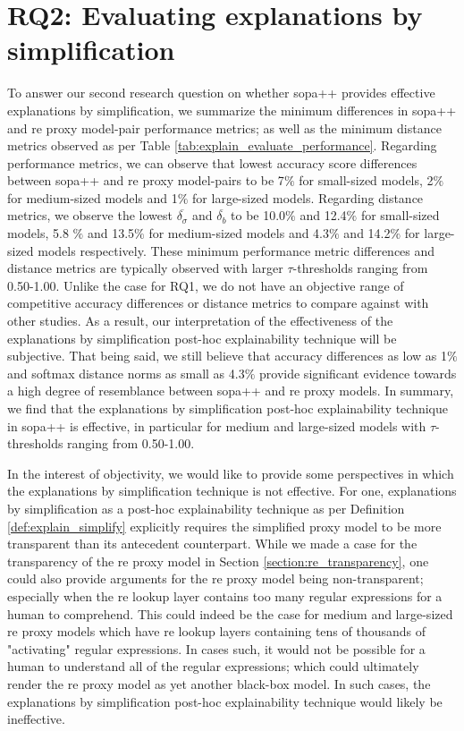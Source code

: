 \section{RQ2: Evaluating explanations by simplification}

To answer our second research question on whether \ac{sopa}++ provides effective
explanations by simplification, we summarize the minimum differences in \ac{sopa}++
and \ac{re} proxy model-pair performance metrics; as well as the minimum distance
metrics observed as per Table \ref{tab:explain_evaluate_performance}. Regarding
performance metrics, we can observe that lowest accuracy score differences
between \ac{sopa}++ and \ac{re} proxy model-pairs to be 7$\%$ for small-sized models, 2$\%$
for medium-sized models and 1$\%$ for large-sized models. Regarding distance
metrics, we observe the lowest $\overline{\delta_{\sigma}}$ and
$\overline{\delta_{b}}$ to be 10.0$\%$ and 12.4$\%$ for small-sized models, 5.8
$\%$ and 13.5$\%$ for medium-sized models and 4.3$\%$ and 14.2$\%$ for
large-sized models respectively. These minimum performance metric differences
and distance metrics are typically observed with larger $\tau$-thresholds
ranging from 0.50-1.00. Unlike the case for RQ1, we do not have an objective
range of competitive accuracy differences or distance metrics to compare against
with other studies. As a result, our interpretation of the effectiveness of the
explanations by simplification post-hoc explainability technique will be
subjective. That being said, we still believe that accuracy differences as low
as 1$\%$ and softmax distance norms as small as 4.3$\%$ provide significant
evidence towards a high degree of resemblance between \ac{sopa}++ and \ac{re} proxy
models. In summary, we find that the explanations by simplification post-hoc
explainability technique in \ac{sopa}++ is effective, in particular for medium and
large-sized models with $\tau$-thresholds ranging from 0.50-1.00.

In the interest of objectivity, we would like to provide some perspectives in
which the explanations by simplification technique is not effective. For one,
explanations by simplification as a post-hoc explainability technique as per
Definition \ref{def:explain_simplify} explicitly requires the simplified proxy
model to be more transparent than its antecedent counterpart. While we made a
case for the transparency of the \ac{re} proxy model in Section
\ref{section:re_transparency}, one could also provide arguments for the \ac{re} proxy
model being non-transparent; especially when the \ac{re} lookup layer contains too
many regular expressions for a human to comprehend. This could indeed be the
case for medium and large-sized \ac{re} proxy models which have \ac{re} lookup layers
containing tens of thousands of "activating" regular expressions. In cases such,
it would not be possible for a human to understand all of the regular
expressions; which could ultimately render the \ac{re} proxy model as yet another
black-box model. In such cases, the explanations by simplification post-hoc
explainability technique would likely be ineffective.

